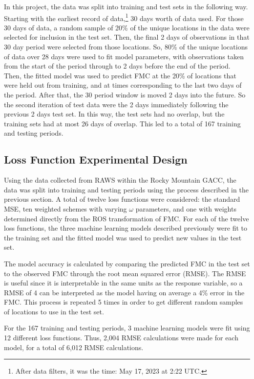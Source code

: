 \documentclass[11pt]{article}%
\begin{document}
In this project, the data was split into training and test sets in the following way. Starting with the earliest record of data,\footnote{After data filters, it was the time: May 17, 2023 at 2:22 UTC.} 30 days worth of data used. For those 30 days of data, a random sample of 20\% of the unique locations in the data were selected for inclusion in the test set. Then, the final 2 days of observations in that 30 day period were selected from those locations. So, 80\% of the unique locations of data over 28 days were used to fit model parameters, with observations taken from the start of the period through to 2 days before the end of the period. Then, the fitted model was used to predict FMC at the 20\% of locations that were held out from training, and at times corresponding to the last two days of the period. After that, the 30 period window is moved 2 days into the future. So the second iteration of test data were the 2 days immediately following the previous 2 days test set. In this way, the test sets had no overlap, but the training sets had at most 26 days of overlap. This led to a total of 167 training and testing periods.



\subsection{Loss Function Experimental Design}

Using the data collected from RAWS within the Rocky Mountain GACC, the data was split into training and testing periods using the process described in the previous section. A total of twelve loss functions were considered: the standard MSE, ten weighted schemes with varying $\omega$ parameters, and one with weights determined directly from the ROS transformation of FMC. For each of the twelve loss functions, the three machine learning models described previously were fit to the training set and the fitted model was used to predict new values in the test set. 

The model accuracy is calculated by comparing the predicted FMC in the test set to the observed FMC through the root mean squared error (RMSE). The RMSE is useful since it is interpretable in the same units as the response variable, so a RMSE of 4 can be interpreted as the model having on average a 4\% error in the FMC. This process is repeated 5 times in order to get different random samples of locations to use in the test set. 

For the 167 training and testing periods, 3 machine learning models were fit using 12 different loss functions. Thus, 2,004 RMSE calculations were made for each model, for a total of 6,012 RMSE calculations.
\end{document}
